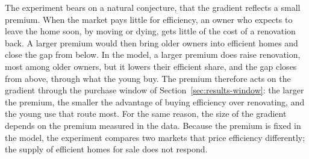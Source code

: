 The experiment bears on a natural conjecture, that the gradient reflects a
small premium. When the market pays little for efficiency, an owner who
expects to leave the home soon, by moving or dying, gets little of the cost
of a renovation back. A larger premium would then bring older owners into
efficient homes and close the gap from below. In the model, a larger premium
does raise renovation, most among older owners, but it lowers their
efficient share, and the gap closes from above, through what the young buy.
The premium therefore acts on the gradient through the purchase window of
Section~\ref{sec:results-window}: the larger the premium, the smaller the
advantage of buying efficiency over renovating, and the young use that
route most. For the same reason, the size of the gradient depends on the
premium measured in the data. Because the premium is fixed in the model,
the experiment compares two markets that price efficiency differently; the
supply of efficient homes for sale does not respond.

% 
